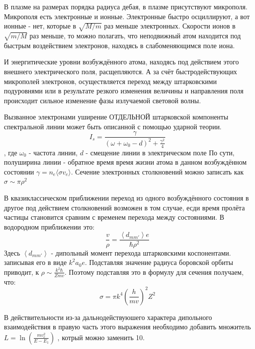 \documentclass[10pt, a4paper]{article}
\begin{document}
В плазме на размерах порядка радиуса дебая, в плазме присутствуют микрополя. Микрополя есть электронные и ионные. Электронные быстро осциллируют, а вот ионные - нет, которые в $\sqrt{M/m}$ раз меньше электронных. Скорости ионов в $\sqrt{m/M}$ раз меньше, то можно полагать, что неподвижный атом находится под быстрым воздействием электронов, находясь в слабоменяющимся поле иона. 

И энергитические уровни возбуждённого атома, находясь под действием этого внешнего электрического поля, расщепляются. А за счёт быстродействующих микрополей электронов, осуществляется переход между штарковскими подуровнями или в результате резкого изменения величины и направления поля происходит сильное изменение фазы излучаемой световой волны. 

Вызванное электронами уширение ОТДЕЛЬНОЙ штарковской компоненты спектральной линии может быть описанной с помощью ударной теории.
\begin{equation}
	I_s=\frac{\gamma}{(\omega + \omega_0 - d)^{2}+ \frac{\gamma^{2}}{4}}
\end{equation}
, где $\omega_0$ - частота линии, $d$ -  смещение линии в электрическом поле
По сути, полуширина линии - обратное время время жизни атома в данном возбуждённом состоянии $\gamma =n_e \langle\sigma v_e\rangle$.
Сечение электронных столкновений можно записать как $\sigma \sim \pi \rho^{2}$

В квазиклассическом приближении переход из одного возбуждённого состояния в другое под действием столкновений возможен в том случае, есди время пролёта частицы становится сравним с временем перехода между состояниями. В водородном приближении это:
\begin{equation}
	\frac{v}{\rho}=\frac{\left\langle d_{m m'}\right\rangle  e}{\hbar \rho^2}
\end{equation}
Здесь $\left\langle d_{m m'}\right\rangle $ - дипольный момент перехода штарковскими коспонентами. записывая его в виде $k^2 a_{0} e$.
Подставляя значение радиуса боровской орбиты приводит, к $\rho \sim \frac{k^2 \hbar}{Zmv}$. Поэтому подставляя это в формулу для сечения получаем, что:
\begin{equation}
	\sigma = \pi k^4 \left(\frac{h}{mv}\right)^2 Z^2
\end{equation}

В действительности из-за дальнодействуюшего характера дипольного взаимодействия в правую часть этого выражения необходимо добавить множитель $L= \ln(\frac{m v_e^{2}}{E-E_1})$ , котрый можно заменить 10.
\end{document}
